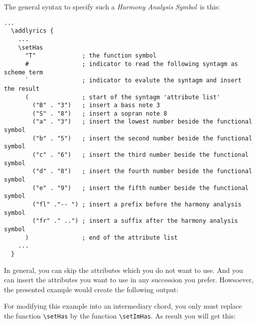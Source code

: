 \documentclass[
  DIV=calc,
  BCOR=5mm,
  12pt,
  headings=small,
  oneside,
  abstract=true,
  toc=bib,
  xcolor=dvipsnames,
  openany,
  ngerman,english]{scrartcl}
\newcommand{\has}[1]{\textit{Harmony Analysis Symbol#1}}
\begin{document}
The general syntax to specify such a \has{}\ is this:

\begin{scriptsize}
\begin{verbatim}
...
  \addlyrics { 
    ...
    \setHas
      "T"             ; the function symbol
      #               ; indicator to read the following syntagm as scheme term
      `               ; indicator to evalute the syntagm and insert the result
      (               ; start of the syntagm 'attribute list'
        ("B" . "3")   ; insert a bass note 3
        ("S" . "8")   ; insert a sopran note 8
        ("a" . "3")   ; insert the lowest number beside the functional symbol
        ("b" . "5")   ; insert the second number beside the functional symbol
        ("c" . "6")   ; insert the third number beside the functional symbol
        ("d" . "8")   ; insert the fourth number beside the functional symbol
        ("e" . "9")   ; insert the fifth number beside the functional symbol
        ("fl" ."-- ") ; insert a prefix before the harmony analysis symbol
        ("fr" ." ..") ; insert a suffix after the harmony analysis symbol
      )               ; end of the attribute list
    ...
  }
\end{verbatim}
\end{scriptsize}

In general, you can skip the attributes which you do not want to use. And you
can insert the attributes you want to use in any succession you prefer.
Howsoever, the presented example would create the following output:

\begin{center}
\end{center}

For modifying this example into an intermediary chord, you only must replace
the function \texttt{\textbackslash setHas} by the function
\texttt{\textbackslash setImHas}. As result you will get this:
\end{document}
